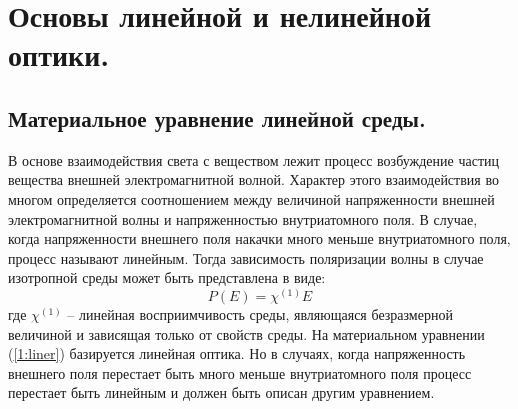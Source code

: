 \section{Основы линейной и нелинейной оптики.}

\subsection{Материальное уравнение линейной среды.}
\hspace*{2mm}
В основе взаимодействия света с веществом лежит процесс возбуждение частиц вещества внешней электромагнитной волной. Характер этого взаимодействия во многом определяется соотношением между величиной напряженности внешней электромагнитной волны и напряженностью внутриатомного поля. В случае, когда напряженности внешнего поля накачки много меньше внутриатомного поля, процесс называют линейным. Тогда зависимость поляризации волны в случае изотропной среды может быть представлена в виде:
\begin{equation}\label{1:liner}
P(E) = \chi^{(1)}E
\end{equation}
где $ \chi^{(1)}$ – линейная восприимчивость среды, являющаяся безразмерной величиной и зависящая только от свойств среды. На материальном уравнении  (\ref{1:liner}) базируется линейная оптика.  Но в случаях, когда напряженность внешнего поля перестает быть много меньше внутриатомного поля процесс перестает быть линейным и должен быть описан другим уравнением. 

